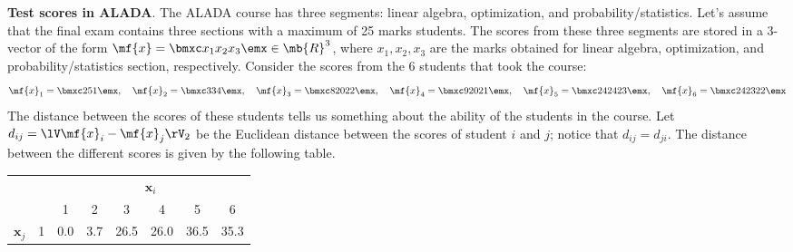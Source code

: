 \begin{boxedstuff}
    \begin{example}
        \textbf{Test scores in ALADA}. The ALADA course has three segments: linear algebra, optimization, and probability/statistics. Let's assume that the final exam contains three sections with a maximum of 25 marks students. The scores from these three segments are stored in a $3$-vector of the form $\mf{x} = \bmxc x_1 \\ x_2 \\ x_3\emx \in \mb{R}^3$, where $x_1, x_2, x_3$ are the marks obtained for linear algebra, optimization, and probability/statistics section, respectively. Consider the scores from the 6 students that took the course:
        \[ \mf{x}_1 = \bmxc 2 \\ 5 \\ 1 \emx, \quad \mf{x}_2 = \bmxc 3 \\ 3 \\ 4 \emx, \quad \mf{x}_3 = \bmxc 8 \\ 20 \\ 22 \emx, \quad \mf{x}_4 = \bmxc 9 \\ 20 \\ 21 \emx, \quad \mf{x}_5 = \bmxc 24 \\ 24 \\ 23 \emx, \quad \mf{x}_6 = \bmxc 24 \\ 23 \\ 22 \emx
        \]
        The distance between the scores of these students tells us something about the ability of the students in the course. Let $d_{ij} = \lV \mf{x}_i - \mf{x}_j \rV_2$ be the Euclidean distance between the scores of student $i$ and $j$; notice that $d_{ij} = d_{ji}$. The distance between the different scores is given by the following table. \\
        \begin{small}
            \begin{center}
            \begin{tabular}{lc|cccccc|}
                \cline{3-8}
                & \multicolumn{1}{l|}{} & \multicolumn{6}{c|}{$\mathbf{x}_i$} \\ \cline{3-8} 
                &  & \multicolumn{1}{c|}{1} & \multicolumn{1}{c|}{2} & \multicolumn{1}{c|}{3} & \multicolumn{1}{c|}{4} & \multicolumn{1}{c|}{5} & 6 \\ \hline
                \multicolumn{1}{|l|}{\multirow{6}{*}{$\mathbf{x}_j$}} & 1 & \multicolumn{1}{c|}{0.0} & \multicolumn{1}{c|}{3.7} & \multicolumn{1}{c|}{26.5} & \multicolumn{1}{c|}{26.0} & \multicolumn{1}{c|}{36.5} & 35.3 \\ \cline{2-8} 

\end{tabular}
\end{center}
\end{small}
\end{example}
\end{boxedstuff}
